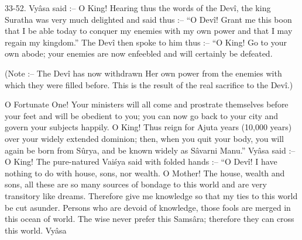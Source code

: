 33-52. Vy\^asa said :-- O King! Hearing thus the words of the Dev\^i, the king Suratha was very much delighted and said thus :-- ``O Dev\^i! Grant me this boon that I be able today to conquer my enemies with my own power and that I may regain my kingdom.'' The Dev\^i then spoke to him thus :-- ``O King! Go to your own abode; your enemies are now enfeebled and will certainly be defeated.

(Note :-- The Dev\^i has now withdrawn Her own power from the enemies with which they were filled before. This is the result of the real sacrifice to the Dev\^i.)

O Fortunate One! Your ministers will all come and prostrate themselves before your feet and will be obedient to you; you can now go back to your city and govern your subjects happily. O King! Thus reign for Ajuta years (10,000 years) over your widely extended dominion; then, when you quit your body, you will again be born from S\^urya, and be known widely as S\^avarni Manu.'' Vy\^asa said :-- O King! The pure-natured Vai\'sya said with folded hands :-- ``O Dev\^i! I have nothing to do with house, sons, nor wealth. O Mother! The house, wealth and sons, all these are so many sources of bondage to this world and are very transitory like dreams. Therefore give me knowledge so that my ties to this world be cut asunder. Persons who are devoid of knowledge, those fools are merged in this ocean of world. The wise never prefer this Sams\^ara; therefore they can cross this world. Vy\^asa

